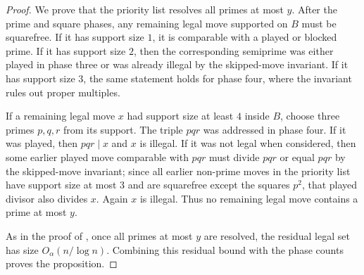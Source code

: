 \begin{proof}
We prove that the priority list resolves all primes at most $y$.  After the
prime and square phases, any remaining legal move supported on $B$ must be
squarefree.  If it has support size $1$, it is comparable with a played or
blocked prime.  If it has support size $2$, then the corresponding semiprime
was either played in phase three or was already illegal by the skipped-move
invariant.  If it has support size $3$, the same statement holds for phase four,
where the invariant rules out proper multiples.

If a remaining legal move $x$ had support size at least $4$ inside $B$, choose
three primes $p,q,r$ from its support.  The triple $pqr$ was addressed in phase
four.  If it was played, then $pqr\mid x$ and $x$ is illegal.  If it was not
legal when considered, then some earlier played move comparable with $pqr$
must divide $pqr$ or equal $pqr$ by the skipped-move invariant; since all
earlier non-prime moves in the priority list have
support size at most $3$ and are squarefree except the squares $p^2$, that
played divisor also divides $x$.  Again $x$ is illegal.  Thus no remaining
legal move contains a prime at most $y$.

As in the proof of , once all primes at most
$y$ are resolved, the residual legal set has size $O_\alpha(n/\log n)$.
Combining this residual bound with the phase counts proves the proposition.
\end{proof}
